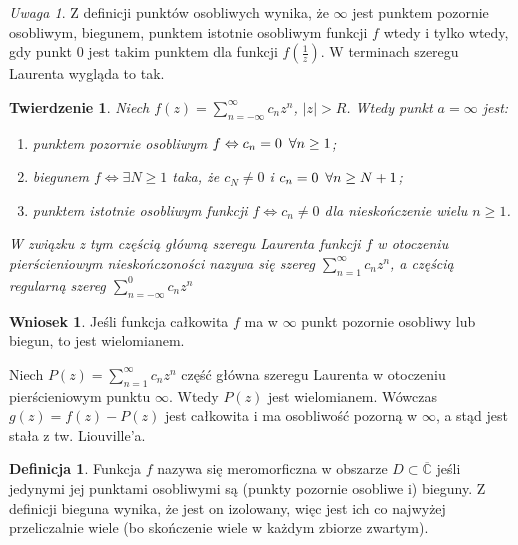 \documentclass[11pt]{article}
\newcommand{\abs}[1]{\left|#1\right|} %
\newcommand{\extcomplex}{\overline{\mathbb{C}}} %
\theoremstyle{plain}
\newtheorem*{theorem}{Twierdzenie}
\theoremstyle{definition}
\newtheorem*{definition}{Definicja}
\newtheorem*{corollary}{Wniosek}
\theoremstyle{remark}
\newtheorem*{remark}{Uwaga}
\let\oldendproof\endproof
\renewenvironment{proof}[1][\proofname]{
  \oldproof[\textsc{\small #1}]
}{\oldendproof}
\begin{document}
\begin{remark}
  Z definicji punktów osobliwych wynika, że $ \infty $ jest punktem pozornie osobliwym, biegunem, punktem istotnie osobliwym funkcji $f$ wtedy i tylko wtedy,
  gdy punkt $0$ jest takim punktem dla funkcji $ f(\frac{1}{z}) $. W terminach szeregu Laurenta wygląda to tak.
\end{remark}

\begin{theorem}
  Niech $ f(z) = \sum_{n=-\infty}^{\infty} c_n z^n $, $ \abs{z} > R $.
  Wtedy punkt $ a = \infty $ jest:
  \begin{enumerate}
    \item punktem pozornie osobliwym $ f \Leftrightarrow c_n = 0 \enskip\forall n \geq 1 $; \label{osobliwy-infty-poz}
    \item biegunem $ f \Leftrightarrow \exists N \geq 1 $ taka, że $ c_N \neq 0 $ i $ c_n = 0 \enskip\forall n \geq N + 1 $; \label{osobliwy-infty-bieg}
    \item  punktem istotnie osobliwym funkcji $ f \Leftrightarrow c_n \neq 0 $ dla nieskończenie wielu $ n \geq 1 $. \label{osobliwy-infty-ist}
  \end{enumerate}
  W związku z tym częścią główną szeregu Laurenta funkcji $ f $ w otoczeniu pierścieniowym nieskończoności nazywa się szereg $ \sum_{n=1}^{\infty} c_n z^n $, a częścią regularną szereg $ \sum_{n=-\infty}^{0} c_n z^n $
\end{theorem}

\begin{corollary}
  Jeśli funkcja całkowita $f$ ma w $ \infty $ punkt pozornie osobliwy lub biegun, to jest wielomianem.
\end{corollary}

\begin{proof}
  Niech $ P(z) = \sum_{n=1}^{\infty} c_n z^n $ część główna szeregu Laurenta w otoczeniu pierścieniowym punktu $ \infty $.
  Wtedy $ P(z) $ jest wielomianem.
  Wówczas $ g(z) = f(z) - P(z) $ jest całkowita i ma osobliwość pozorną w $ \infty $,
  a stąd jest stała z tw. Liouville'a.
\end{proof}

\begin{definition}
  Funkcja $f$ nazywa się meromorficzna w obszarze $ D \subset \extcomplex $ jeśli jedynymi jej punktami osobliwymi są (punkty pozornie osobliwe i) bieguny.
  Z definicji bieguna wynika, że jest on izolowany, więc jest ich co najwyżej przeliczalnie wiele (bo skończenie wiele w każdym zbiorze zwartym).
\end{definition}
\end{document}
